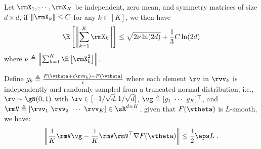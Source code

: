 \begin{lemma}\label{le:Bernstein}
Let $\rmX_1,\cdots,\rmX_K$ be independent, zero mean, and symmetry matrices of size $d \times d$, if $\left\|\rmX_k\right\| \leq C$ for any $k \in [K]$, we then have
\begin{equation}
    \E\left[\left\|\sum_{k=1}^K \rmX_k \right\|\right] \leq \sqrt{2\nu\ln(2d)} + \frac{1}{3}C\ln(2d)
\end{equation}
where $\nu \triangleq \left\|\sum_{k=1}^K \E\left[\rmX_k^2\right]\right\|$.
\end{lemma}

\begin{lemma}\label{thm:norm}
Define 
$
g_k \triangleq \frac{F(\vtheta + \epsilon \rvv_k) - F(\vtheta)}{\epsilon}
$ where each element $\rv$ in $\rvv_k$ is independently and randomly sampled from a truncated normal distribution, i.e., $\rv \sim \gN(0, 1)$ with $\rv \in [-1/\sqrt{d},1/\sqrt{d}]$, $\vg \triangleq [g_1\ \cdots\ g_K]^{\top}$, and $\rmV \triangleq [\rvv_1\ \rvv_2\ \cdots\ \rvv_K] \in \sR^{d \times K}$, given that  $F(\vtheta)$ is $L$-smooth, we have:
\begin{equation*}
\left\|\frac{1}{K}\rmV\vg - \frac{1}{K}\rmV\rmV^{\top} \nabla F(\vtheta)\right\| \leq \frac{1}{2}\eps L\ . 
\end{equation*}
\end{lemma}

